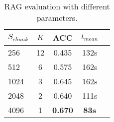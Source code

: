 \begin{table}[ht!]
  \centering
  \begin{tabular}{lc|ccc}
    \toprule
    $S_{chunk}$ & $K$ & ACC & $t_{mean}$ \\
    \midrule
    256  & 12 & 0.435 & 132s \\
    512  & 6  & 0.575 & 162s \\
    1024 & 3  & 0.645 & 162s \\
    2048 & 2  & 0.640 & 111s \\
    4096 & 1  & \textbf{0.670} & \textbf{83s} \\
    \bottomrule
  \end{tabular}
  \caption{\ac{RAG} evaluation with different parameters.}
  \label{tab:RAG_evaluation}
\end{table}
  